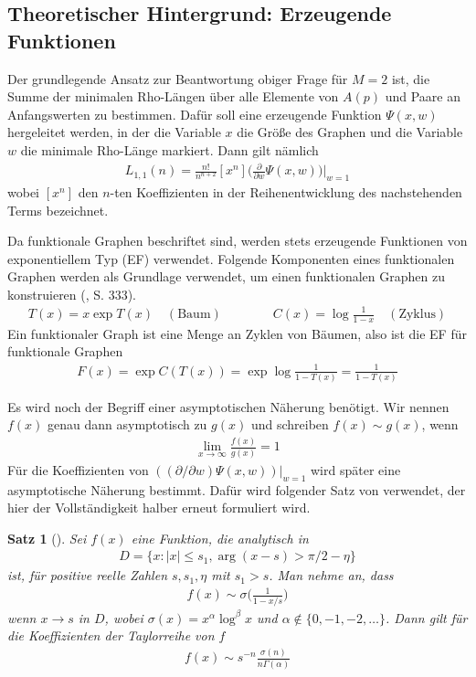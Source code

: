 \documentclass[a4paper, 10pt, ngerman]{article}
\newtheorem{theorem}{Satz}
\begin{document}
\subsection{Theoretischer Hintergrund: Erzeugende Funktionen}

Der grundlegende Ansatz zur Beantwortung obiger Frage für $M = 2$ ist, die Summe der minimalen Rho-Längen über alle Elemente von $A(p)$ und Paare an Anfangswerten zu bestimmen. Dafür soll eine erzeugende Funktion $\Psi(x, w)$ hergeleitet werden, in der die Variable $x$ die Größe des Graphen und die Variable $w$ die minimale Rho-Länge markiert. Dann gilt nämlich
\begin{align*}
    L_{1, 1}(n) = \frac {n!}{n^{n + 2}} [x^n] \Bigg (\frac {\partial} {\partial w} \Psi(x, w) \Bigg ) \Bigg \vert_{w = 1}
\end{align*}
wobei $[x^n]$ den $n$-ten Koeffizienten in der Reihenentwicklung des nachstehenden Terms bezeichnet.

Da funktionale Graphen beschriftet sind, werden stets erzeugende Funktionen von exponentiellem Typ (EF) verwendet. Folgende Komponenten eines funktionalen Graphen werden als Grundlage verwendet, um einen funktionalen Graphen zu konstruieren (\cite{fo90}, S. 333).
\begin{align*}
    T(x) = x \exp T(x) \quad (\text{Baum}) \qquad\qquad C(x) = \log \frac {1} {1 - x} \quad (\text{Zyklus})
\end{align*}
Ein funktionaler Graph ist eine Menge an Zyklen von Bäumen, also ist die EF für funktionale Graphen
\begin{align*}
    F(x) = \exp C(T(x)) = \exp \log \frac 1 {1 - T(x)} = \frac 1 {1 - T(x)}
\end{align*}

Es wird noch der Begriff einer asymptotischen Näherung benötigt. Wir nennen $f(x)$ genau dann asymptotisch zu $g(x)$ und schreiben $f(x) \sim g(x)$, wenn
\begin{align*}
    \lim_{x \to \infty} \frac {f(x)} {g(x)} = 1
\end{align*}
Für die Koeffizienten von $((\partial / \partial w) \Psi(x, w)) |_{w = 1}$ wird später eine asymptotische Näherung bestimmt. Dafür wird folgender Satz von \cite{fo90} verwendet, der hier der Vollständigkeit halber erneut formuliert wird.

\begin{theorem}[\cite{fo90}]
    Sei $f(x)$ eine Funktion, die analytisch in
    \begin{align*}
        D = \{x : |x| \le s_1, \arg(x - s) > \pi/2 - \eta \}
    \end{align*}
    ist, für positive reelle Zahlen $s, s_1, \eta$ mit $s_1 > s$. Man nehme an, dass
    \begin{align*}
        f(x) \sim \sigma \bigg ( \frac 1 {1 - x/s} \bigg )
    \end{align*}
    wenn $x \to s$ in $D$, wobei $\sigma(x) = x^\alpha \log^\beta x$ und $\alpha \notin \{0, -1, -2, \dots\}$. Dann gilt für die Koeffizienten der Taylorreihe von $f$
    \begin{align*}
        [x^n]f(x) \sim s^{-n} \frac {\sigma(n)}{n\Gamma(\alpha)}
    \end{align*}
\end{theorem}
\end{document}
